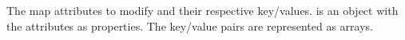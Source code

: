The map attributes to modify and their respective key/values.  
is an object with the attributes as properties.  The key/value pairs are
represented as arrays.
